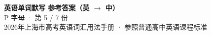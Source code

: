 \documentclass[10pt,a4paper]{article}
\begin{document}
\pagestyle{plain}

\begin{center}
{\LARGE\bfseries 英语单词默写 \quad 参考答案（英 $\to$ 中）}\\[0.22em]
{\large P 字母 · 第 5 / 7 份}\\[0.18em]
{\small 2026年上海市高考英语词汇用法手册 · 参照普通高中英语课程标准}
\end{center}

\vspace{0.2em}
\noindent{\color{rulegray}\rule{\textwidth}{0.8pt}}

\vspace{0.35em}

\vspace{0.25em}
\renewcommand{\arraystretch}{1.32}
\end{document}
